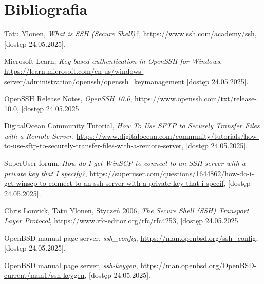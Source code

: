 \documentclass{article}
\newcounter{firstbib} %
\begin{document}
\section{Bibliografia}
\renewcommand{\refname}{Artykuły}
\begin{thebibliography}{9}

    Tatu Ylonen,
    \emph{What is SSH (Secure Shell)?},
    \url{https://www.ssh.com/academy/ssh},
    [dostęp 24.05.2025].
    
    Microsoft Learn,
    \emph{Key-based authentication in OpenSSH for Windows},
    \url{https://learn.microsoft.com/en-us/windows-server/administration/openssh/openssh_keymanagement}
    [dostęp 24.05.2025].

    OpenSSH Release Notes,
    \emph{OpenSSH 10.0},
    \url{https://www.openssh.com/txt/release-10.0},
    [dostęp 24.05.2025].

    DigitalOcean Community Tutorial,
    \emph{How To Use SFTP to Securely Transfer Files with a Remote Server},
    \url{https://www.digitalocean.com/community/tutorials/how-to-use-sftp-to-securely-transfer-files-with-a-remote-server},
    [dostęp 24.05.2025].

    SuperUser forum,
    \emph{How do I get WinSCP to connect to an SSH server with a private key that I specify?},
    \url{https://superuser.com/questions/1644862/how-do-i-get-winscp-to-connect-to-an-ssh-server-with-a-private-key-that-i-specif},
    [dostęp 24.05.2025].
    
\setcounter{firstbib}{\value{enumiv}}
\end{thebibliography}
\renewcommand{\refname}{Dokumentacje techniczne}
\begin{thebibliography}{9}
\setcounter{enumiv}{\value{firstbib}}

    Chris Lonvick, Tatu Ylonen,
    Styczeń 2006,
    \emph{The Secure Shell (SSH) Transport Layer Protocol},
    \url{https://www.rfc-editor.org/rfc/rfc4253},
    [dostęp 24.05.2025].    

    OpenBSD manual page server,
    \emph{ssh\_config},
    \url{https://man.openbsd.org/ssh_config},
    [dostęp 24.05.2025].    

    OpenBSD manual page server,
    \emph{ssh-keygen},
    \url{https://man.openbsd.org/OpenBSD-current/man1/ssh-keygen},
    [dostęp 24.05.2025].    
    
\end{thebibliography}
\end{document}
